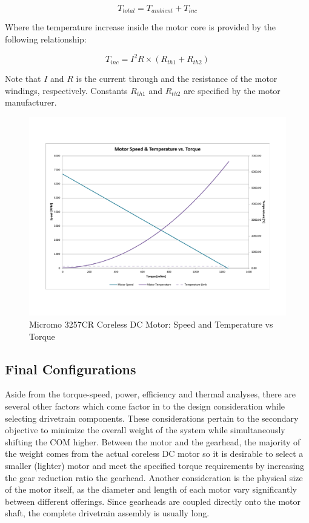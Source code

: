 \begin{equation}
	T_{total} = T_{ambient} + T_{inc}
\end{equation}

Where the temperature increase inside the motor core is provided by the following relationship: 

\begin{equation}
	T_{inc} = I^{2}R \times (R_{th1} + R_{th2})
\end{equation}

Note that $I$ and $R$ is the current through and the resistance of the motor windings, respectively. Constants $R_{th1}$ and $R_{th2}$ are specified by the motor manufacturer. 


\begin{figure}[!ht]
	\begin{center}
    \includegraphics[trim = 20mm 30mm 20mm 30mm,clip,width=15cm]{fig/design/motor3.pdf}
	\end{center}
  \caption{Micromo 3257CR Coreless DC Motor: Speed and Temperature vs Torque}
\end{figure}

\subsection{Final Configurations} %
\label{sub:final_configurations}
Aside from the torque-speed, power, efficiency and thermal analyses, there are several other factors which come factor in to the design consideration while selecting drivetrain components. These considerations pertain to the secondary objective to minimize the overall weight of the system while simultaneously shifting the COM higher. Between the motor and the gearhead, the majority of the weight comes from the actual coreless DC motor so it is desirable to select a smaller (lighter) motor and meet the specified torque requirements by increasing the gear reduction ratio the gearhead. Another consideration is the physical size of the motor itself, as the diameter and length of each motor vary significantly between different offerings. Since gearheads are coupled directly onto the motor shaft, the complete drivetrain assembly is usually long. 

